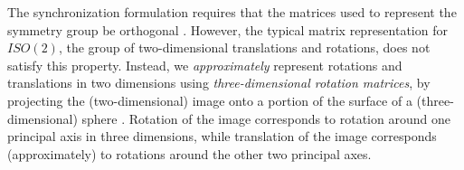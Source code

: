 \documentclass{pnastwo}
\begin{document}
The synchronization formulation requires that the matrices used to represent the symmetry group be orthogonal \cite{singer2013spectral}.  
%
However, the typical matrix representation for $ISO(2)$, the group of two-dimensional translations and rotations, does not satisfy this property.
%
Instead, we {\it approximately} represent rotations and translations in two dimensions using {\it three-dimensional rotation matrices}, by projecting the (two-dimensional) image onto a portion of the surface of a (three-dimensional) sphere \cite{singer2011angular}.
%
Rotation of the image corresponds to rotation around one principal axis in three dimensions, while translation of the image corresponds (approximately) to rotations around the other two principal axes. %
%
\end{document}
